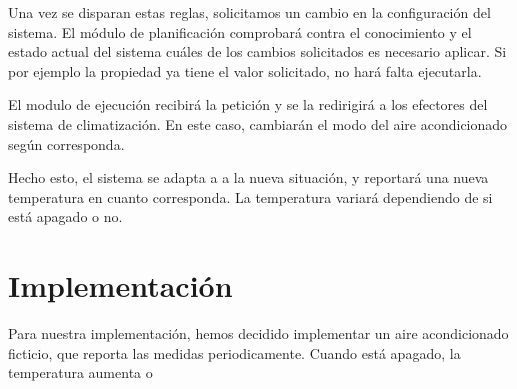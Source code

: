 Una vez se disparan estas reglas, solicitamos un cambio en la configuración del sistema. El módulo de planificación comprobará contra el conocimiento y el estado actual del sistema cuáles de los cambios solicitados es necesario aplicar. Si por ejemplo la propiedad ya tiene el valor solicitado, no hará falta ejecutarla.

El modulo de ejecución recibirá la petición y se la redirigirá a los efectores del sistema de climatización. En este caso, cambiarán el modo del aire acondicionado según corresponda.

Hecho esto, el sistema se adapta a a la nueva situación, y reportará una nueva temperatura en cuanto corresponda. La temperatura variará dependiendo de si está apagado o no.


\section{Implementación}

Para nuestra implementación, hemos decidido implementar un aire acondicionado ficticio, que reporta las medidas periodicamente. Cuando está apagado, la temperatura aumenta o
